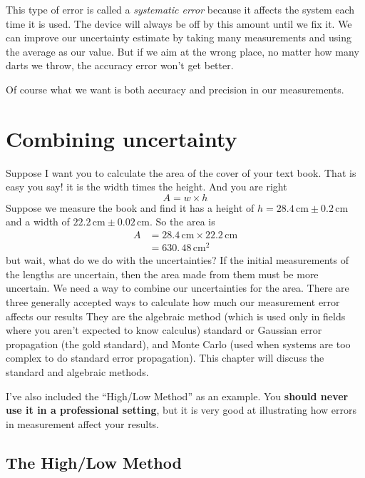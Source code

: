 \documentclass[twoside,11pt,ShortChapTitles]{BYUTextbook}
\begin{document}
This type of error is called a \emph{systematic error} because it affects the
system each time it is used. The device will always be off by this amount
until we fix it. We can improve our uncertainty estimate by taking many
measurements and using the average as our value. But if we aim at the wrong
place, no matter how many darts we throw, the accuracy error won't get better.

Of course what we want is both accuracy and precision in our measurements.

\section{Combining uncertainty}

Suppose I want you to calculate the area of the cover of your text book. That
is easy you say! it is the width times the height. And you are right
\[
A=w\times h
\]
Suppose we measure the book and find it has a height of $h=28.4\,\text{cm} \pm0.2\,\text{cm} $ and a width of $22.2\,\text{cm} \pm0.02\,\text{cm}$. So the area is
\begin{align*}
A  & =28.4\,\text{cm} \times22.2\,\text{cm} \\
& =630.\,\allowbreak48\,\text{cm} ^{2}\end{align*}
but wait, what do we do with the uncertainties? If the initial measurements of
the lengths are uncertain, then the area made from them must be more
uncertain. We need a way to combine our uncertainties for the area.  There are three generally accepted ways to calculate how much our measurement error affects our results  They are the algebraic method (which is used only in fields where you aren't expected to know calculus) standard or Gaussian error propagation (the gold standard), and Monte Carlo (used when systems are too complex to do standard error propagation).  This chapter will discuss the standard and algebraic methods.

I've also included the ``High/Low Method'' as an example.  You {\bf should never use it in a professional setting}, but it is very good at illustrating how errors in measurement affect your results.

\subsection{The High/Low Method}
\end{document}
